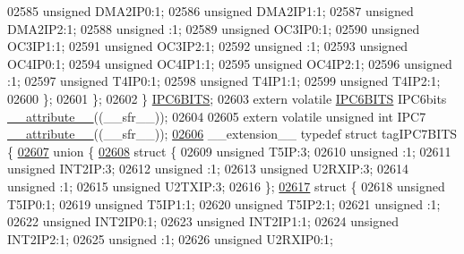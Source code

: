 \begin{DoxyCode}
02585       \textcolor{keywordtype}{unsigned} DMA2IP0:1;
02586       \textcolor{keywordtype}{unsigned} DMA2IP1:1;
02587       \textcolor{keywordtype}{unsigned} DMA2IP2:1;
02588       \textcolor{keywordtype}{unsigned} :1;
02589       \textcolor{keywordtype}{unsigned} OC3IP0:1;
02590       \textcolor{keywordtype}{unsigned} OC3IP1:1;
02591       \textcolor{keywordtype}{unsigned} OC3IP2:1;
02592       \textcolor{keywordtype}{unsigned} :1;
02593       \textcolor{keywordtype}{unsigned} OC4IP0:1;
02594       \textcolor{keywordtype}{unsigned} OC4IP1:1;
02595       \textcolor{keywordtype}{unsigned} OC4IP2:1;
02596       \textcolor{keywordtype}{unsigned} :1;
02597       \textcolor{keywordtype}{unsigned} T4IP0:1;
02598       \textcolor{keywordtype}{unsigned} T4IP1:1;
02599       \textcolor{keywordtype}{unsigned} T4IP2:1;
02600     \};
02601   \};
02602 \} \hyperlink{a00008_d8/d75/a00555}{IPC6BITS};
02603 \textcolor{keyword}{extern} \textcolor{keyword}{volatile} \hyperlink{a00008_d8/d75/a00555}{IPC6BITS} IPC6bits \hyperlink{a00009_a493c46f03454991ccc5aa7a6e1dfb2a7}{\_\_attribute\_\_}((\_\_sfr\_\_));
02604 
02605 \textcolor{keyword}{extern} \textcolor{keyword}{volatile} \textcolor{keywordtype}{unsigned} \textcolor{keywordtype}{int}  IPC7 \hyperlink{a00009_a493c46f03454991ccc5aa7a6e1dfb2a7}{\_\_attribute\_\_}((\_\_sfr\_\_));
\hypertarget{a00009_source_l02606}{}\hyperlink{a00008}{02606} \_\_extension\_\_ \textcolor{keyword}{typedef} \textcolor{keyword}{struct }tagIPC7BITS \{
\hypertarget{a00009_source_l02607}{}\hyperlink{a00009}{02607}   \textcolor{keyword}{union }\{
\hypertarget{a00009_source_l02608}{}\hyperlink{a00009}{02608}     \textcolor{keyword}{struct }\{
02609       \textcolor{keywordtype}{unsigned} T5IP:3;
02610       \textcolor{keywordtype}{unsigned} :1;
02611       \textcolor{keywordtype}{unsigned} INT2IP:3;
02612       \textcolor{keywordtype}{unsigned} :1;
02613       \textcolor{keywordtype}{unsigned} U2RXIP:3;
02614       \textcolor{keywordtype}{unsigned} :1;
02615       \textcolor{keywordtype}{unsigned} U2TXIP:3;
02616     \};
\hypertarget{a00009_source_l02617}{}\hyperlink{a00009}{02617}     \textcolor{keyword}{struct }\{
02618       \textcolor{keywordtype}{unsigned} T5IP0:1;
02619       \textcolor{keywordtype}{unsigned} T5IP1:1;
02620       \textcolor{keywordtype}{unsigned} T5IP2:1;
02621       \textcolor{keywordtype}{unsigned} :1;
02622       \textcolor{keywordtype}{unsigned} INT2IP0:1;
02623       \textcolor{keywordtype}{unsigned} INT2IP1:1;
02624       \textcolor{keywordtype}{unsigned} INT2IP2:1;
02625       \textcolor{keywordtype}{unsigned} :1;
02626       \textcolor{keywordtype}{unsigned} U2RXIP0:1;

\end{DoxyCode}
